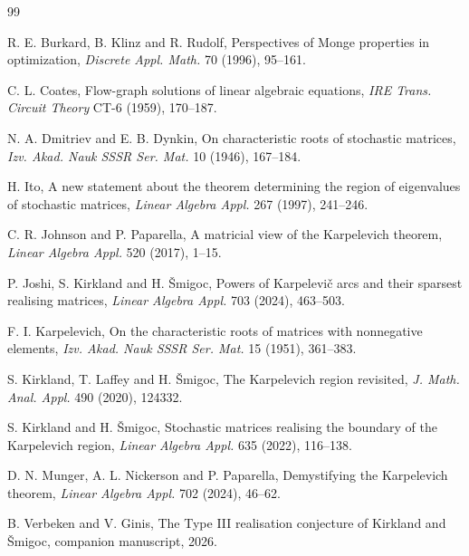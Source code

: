 \documentclass[11pt]{article}
\theoremstyle{definition}
\theoremstyle{remark}
\begin{document}
\begin{thebibliography}{99}

R. E. Burkard, B. Klinz and R. Rudolf, Perspectives of Monge properties in optimization, \emph{Discrete Appl. Math.} 70 (1996), 95--161.

C. L. Coates, Flow-graph solutions of linear algebraic equations, \emph{IRE Trans. Circuit Theory} CT-6 (1959), 170--187.

N. A. Dmitriev and E. B. Dynkin, On characteristic roots of stochastic matrices, \emph{Izv. Akad. Nauk SSSR Ser. Mat.} 10 (1946), 167--184.

H. Ito, A new statement about the theorem determining the region of eigenvalues of stochastic matrices, \emph{Linear Algebra Appl.} 267 (1997), 241--246.

C. R. Johnson and P. Paparella, A matricial view of the Karpelevich theorem, \emph{Linear Algebra Appl.} 520 (2017), 1--15.

P. Joshi, S. Kirkland and H. \v Smigoc, Powers of Karpelevi\v c arcs and their sparsest realising matrices, \emph{Linear Algebra Appl.} 703 (2024), 463--503.

F. I. Karpelevich, On the characteristic roots of matrices with nonnegative elements, \emph{Izv. Akad. Nauk SSSR Ser. Mat.} 15 (1951), 361--383.

S. Kirkland, T. Laffey and H. \v Smigoc, The Karpelevich region revisited, \emph{J. Math. Anal. Appl.} 490 (2020), 124332.

S. Kirkland and H. \v Smigoc, Stochastic matrices realising the boundary of the Karpelevich region, \emph{Linear Algebra Appl.} 635 (2022), 116--138.

D. N. Munger, A. L. Nickerson and P. Paparella, Demystifying the Karpelevich theorem, \emph{Linear Algebra Appl.} 702 (2024), 46--62.

B. Verbeken and V. Ginis, The Type III realisation conjecture of Kirkland and \v Smigoc, companion manuscript, 2026.

\end{thebibliography}
\end{document}
